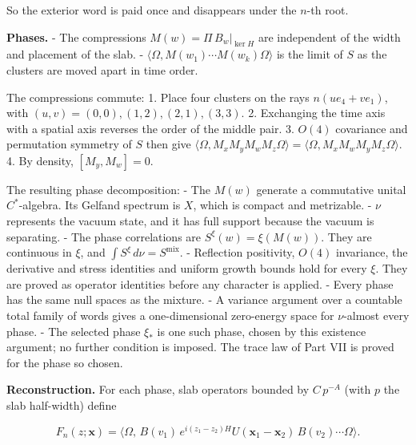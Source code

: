 \documentclass[
  letterpaper,
  11pt]{article}
\begin{document}
So the exterior word is paid once and disappears under the \(n\)-th
root.

\textbf{Phases.} - The compressions \(M(w)=\Pi\,B_w|_{\ker H}\) are
independent of the width and placement of the slab. -
\(\langle\Omega,M(w_1)\cdots M(w_k)\Omega\rangle\) is the limit of \(S\)
as the clusters are moved apart in time order.

The compressions commute: 1. Place four clusters on the rays
\(n(ue_4+ve_1)\), with \((u,v)=(0,0),(1,2),(2,1),(3,3)\). 2. Exchanging
the time axis with a spatial axis reverses the order of the middle pair.
3. \(O(4)\) covariance and permutation symmetry of \(S\) then give
\(\langle\Omega,M_xM_yM_wM_z\Omega\rangle=\langle\Omega,M_xM_wM_yM_z\Omega\rangle\).
4. By density, \([M_y,M_w]=0\).

The resulting phase decomposition: - The \(M(w)\) generate a commutative
unital \(C^\ast\)-algebra. Its Gelfand spectrum is \(X\), which is
compact and metrizable. - \(\nu\) represents the vacuum state, and it
has full support because the vacuum is separating. - The phase
correlations are \(S^\xi(w)=\xi(M(w))\). They are continuous in \(\xi\),
and \(\int S^\xi\,d\nu=S^{\mathrm{mix}}\). - Reflection positivity,
\(O(4)\) invariance, the derivative and stress identities and uniform
growth bounds hold for every \(\xi\). They are proved as operator
identities before any character is applied. - Every phase has the same
null spaces as the mixture. - A variance argument over a countable total
family of words gives a one-dimensional zero-energy space for
\(\nu\)-almost every phase. - The selected phase \(\xi_\ast\) is one
such phase, chosen by this existence argument; no further condition is
imposed. The trace law of Part VII is proved for the phase so chosen.

\textbf{Reconstruction.} For each phase, slab operators bounded by
\(C\,p^{-A}\) (with \(p\) the slab half-width) define

\[F_n(z;\mathbf x)=\big\langle\Omega,\,B(v_1)\,e^{i(z_1-z_2)H}U(\mathbf x_1-\mathbf x_2)\,B(v_2)\cdots\Omega\big\rangle .\]
\end{document}
